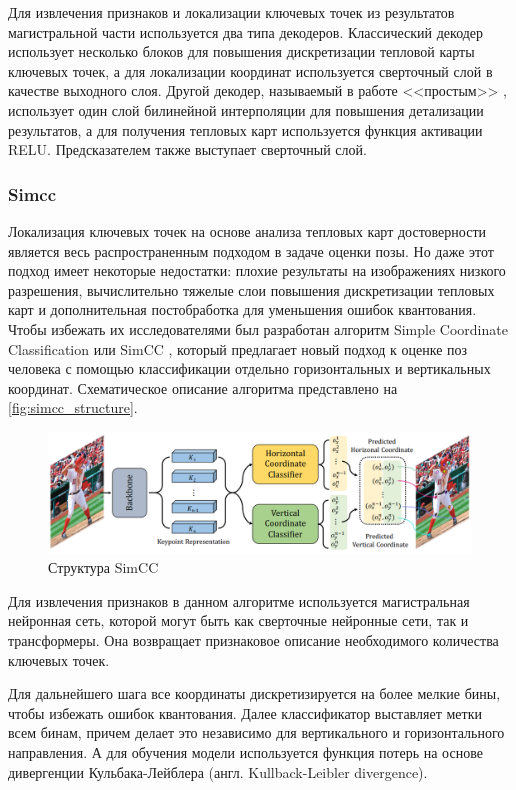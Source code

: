 Для извлечения признаков и локализации ключевых точек из результатов магистральной части используется два типа декодеров. Классический декодер использует несколько блоков для повышения дискретизации тепловой карты ключевых точек, а для локализации координат используется сверточный слой в качестве выходного слоя. Другой декодер, называемый в работе <<простым>> \cite{vitpose}, использует один слой билинейной интерполяции для повышения детализации результатов, а для получения тепловых карт используется функция активации RELU. Предсказателем также выступает сверточный слой.


\subsubsection*{Simcc}
\label{subsec:simcc}

Локализация ключевых точек на основе анализа тепловых карт достоверности является весь распространенным подходом в задаче оценки позы. Но даже этот подход имеет некоторые недостатки: плохие результаты на изображениях низкого разрешения, вычислительно тяжелые слои повышения дискретизации тепловых карт и дополнительная постобработка для уменьшения ошибок квантования. Чтобы избежать их исследователями был разработан алгоритм Simple Coordinate Classification или SimCC \cite{simcc}, который предлагает новый подход к оценке поз человека с помощью классификации отдельно горизонтальных и вертикальных координат. Схематическое описание алгоритма представлено на \autoref{fig:simcc_structure}.

\begin{figure}[h]
	\centering
	\includegraphics[width=\textwidth]{./images/review/simcc_structure}
	\caption{Структура SimCC \cite{simcc}}
	\label{fig:simcc_structure}
\end{figure}

Для извлечения признаков в данном алгоритме используется магистральная нейронная сеть, которой могут быть как сверточные нейронные сети, так и трансформеры. Она возвращает признаковое описание необходимого количества ключевых точек.

Для дальнейшего шага все координаты дискретизируется на более мелкие бины, чтобы избежать ошибок квантования. Далее классификатор выставляет метки всем бинам, причем делает это независимо для вертикального и горизонтального направления. А для обучения модели используется функция потерь на основе дивергенции Кульбака-Лейблера (англ. Kullback-Leibler divergence).

